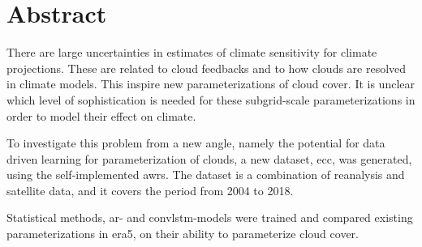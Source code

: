\chapter*{Abstract}

There are large uncertainties in estimates of climate sensitivity for climate projections. These are related to cloud feedbacks and to how clouds are resolved in climate models. This inspire new parameterizations of cloud cover. It is unclear which level of sophistication is needed for these subgrid-scale parameterizations in order to model their effect on climate.

To investigate this problem from a new angle, namely the potential for data driven learning for parameterization of clouds, a new dataset, \acrfull{ecc}, was generated, using the self-implemented \acrfull{awrs}. The dataset is a combination of reanalysis and satellite data, and it covers the period from 2004 to 2018. %

Statistical methods, \acrfull{ar}- and \acrfull{convlstm}-models were trained and compared existing parameterizations in \acrshort{era5}, on their ability to parameterize cloud cover. 

